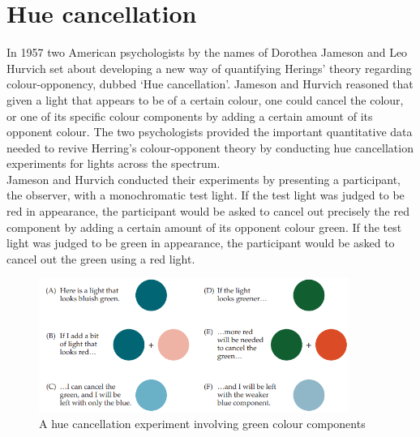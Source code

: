 \documentclass[a4paper,12pt,titlepage, oneside]{article}
\begin{document}
\section{Hue cancellation}
In 1957 two American psychologists by 
the names of Dorothea Jameson and Leo Hurvich 
set about developing a new way of quantifying 
Herings’ theory regarding colour-opponency, 
dubbed ‘Hue cancellation’. Jameson and Hurvich 
reasoned that given a light that appears to be of a 
certain colour, one could cancel the colour, or one of 
its specific colour components by adding a certain 
amount of its opponent colour. \cite{SPCbook} 
The two psychologists provided the important 
quantitative data needed to revive Herring’s 
colour-opponent theory by conducting hue 
cancellation experiments for lights across the spectrum. \cite{SPCbook}\\
Jameson and Hurvich conducted their experiments 
by presenting a participant, the observer, with a 
monochromatic test light. If the test light was judged 
to be red in appearance, the participant would be asked 
to cancel out precisely the red component by 
adding a certain amount of its opponent colour green. 
If the test light was judged to be green in appearance, 
the participant would be asked to cancel 
out the green using a red light.\\
\begin{figure}[h!]
        \centering
        \includegraphics[width=0.9\textwidth]{hue}
        \caption{A hue cancellation experiment involving green colour components \cite{SPCbook}}
\label{hue}
\end{figure}
\end{document}
